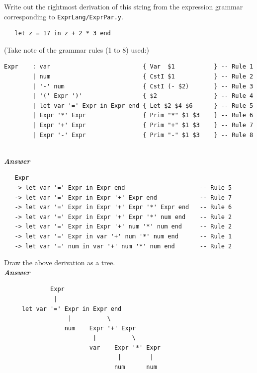 \documentclass[a4paper]{article}
\begin{document}
\begin{exercise}\label{exer-expr-derivation}
  Write out the rightmost derivation of this string from the
  expression grammar corresponding to \texttt{ExprLang/ExprPar.y}\@.  
  
{\codesetup\begin{verbatim}
   let z = 17 in z + 2 * 3 end 
\end{verbatim}} 

\noindent
  (Take note of the grammar rules (1 to 8) used:)
  
{\codesetup\begin{verbatim}
Expr    : var                          { Var  $1           } -- Rule 1
        | num                          { CstI $1           } -- Rule 2
        | '-' num                      { CstI (- $2)       } -- Rule 3
        | '(' Expr ')'                 { $2                } -- Rule 4
        | let var '=' Expr in Expr end { Let $2 $4 $6      } -- Rule 5
        | Expr '*' Expr                { Prim "*" $1 $3    } -- Rule 6
        | Expr '+' Expr                { Prim "+" $1 $3    } -- Rule 7
        | Expr '-' Expr                { Prim "-" $1 $3    } -- Rule 8
        
\end{verbatim}}  


\noindent
\textbf{\emph{Answer}} 
{\codesetup\begin{verbatim}
   Expr
   -> let var '=' Expr in Expr end                     -- Rule 5
   -> let var '=' Expr in Expr '+' Expr end            -- Rule 7
   -> let var '=' Expr in Expr '+' Expr '*' Expr end   -- Rule 6
   -> let var '=' Expr in Expr '+' Expr '*' num end    -- Rule 2
   -> let var '=' Expr in Expr '+' num '*' num end     -- Rule 2
   -> let var '=' Expr in var '+' num '*' num end      -- Rule 1
   -> let var '=' num in var '+' num '*' num end       -- Rule 2
\end{verbatim}} 


\end{exercise}


\begin{exercise}\label{exer-expr-derivation-tree}
  Draw the above derivation as a tree. \\
  
\noindent
\textbf{\emph{Answer}} 
{\codesetup\begin{verbatim}
             Expr
              |
     let var '=' Expr in Expr end
                  |          \ 
                 num    Expr '+' Expr 
                         |          \ 
                        var    Expr '*' Expr
                                |        |
                               num      num
\end{verbatim}} 


\end{exercise}
\end{document}
